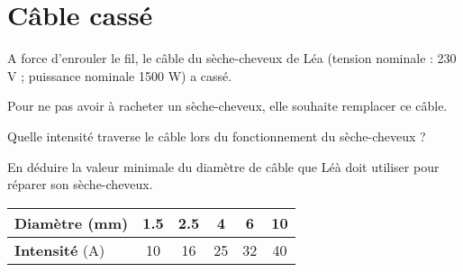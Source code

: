 \section{Câble cassé}

A force d'enrouler le fil, le câble du sèche-cheveux de Léa (tension nominale : 230 V ; puissance nominale \num{1500} W) a cassé.

Pour ne pas avoir à racheter un sèche-cheveux, elle souhaite remplacer ce câble.

\begin{questions}
	\question Quelle intensité traverse le câble lors du fonctionnement du sèche-cheveux ?
	
	\fillwithdottedlines{2cm}
	
	\question En déduire la  valeur minimale du diamètre de câble que Léà doit utiliser pour réparer son sèche-cheveux.
	
\begin{center}
		\begin{tabular}{|@{\ }l@{\ }|@{\ }c@{\ }|@{\ }c@{\ }|@{\ }c@{\ }|@{\ }c@{\ }|@{\ }c@{\ }|}
		\hline
		\textbf{Diamètre} (mm) & \num{1.5} & \num{2.5} & 4  & 6  & 10 \\ \hline
		\textbf{Intensité} (A) & 10        & 16        & 25 & 32 & 40 \\ \hline
	\end{tabular}
\end{center}

\fillwithdottedlines{2cm}
\end{questions}